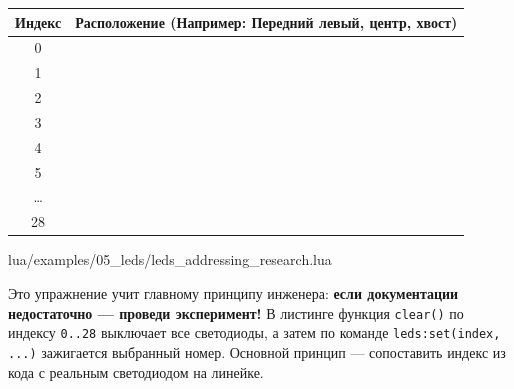 \begin{center}
\renewcommand{\arraystretch}{1.5}
\begin{tabular}{|c|p{8cm}|}
\hline
\rowcolor{GeoskanBlue!20} \textbf{Индекс} & \textbf{Расположение (Например: Передний левый, центр, хвост)} \\
\hline
0 & \dotfill \\
\hline
1 & \dotfill \\
\hline
2 & \dotfill \\
\hline
3 & \dotfill \\
\hline
4 & \dotfill \\
\hline
5 & \dotfill \\
\hline
\dots & \dotfill \\
\hline
28 & \dotfill \\
\hline
\end{tabular}
\end{center}

\begin{codebox}
\begin{codefile}{lua/examples/05_leds/leds_addressing_research.lua}
\end{codefile}
\end{codebox}

Это упражнение учит главному принципу инженера: \textbf{если документации недостаточно — проведи эксперимент!} В листинге функция \verb|clear()| по индексу \verb|0..28| выключает все светодиоды, а затем по команде \verb|leds:set(index, ...)| зажигается выбранный номер. Основной принцип — сопоставить индекс из кода с реальным светодиодом на линейке.
